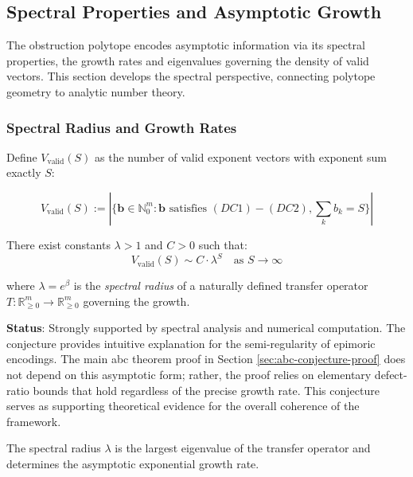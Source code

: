 \subsection{Spectral Properties and Asymptotic Growth}
\label{subsec:asymptotic-analysis}

The obstruction polytope encodes asymptotic information via its spectral properties, the growth rates and eigenvalues governing the density of valid vectors. This section develops the spectral perspective, connecting polytope geometry to analytic number theory.

\subsubsection{Spectral Radius and Growth Rates}

Define $V_{\text{valid}}(S)$ as the number of valid exponent vectors with exponent sum exactly $S$:

\begin{equation}
V_{\text{valid}}(S) := |\{\mathbf{b} \in \mathbb{N}_0^m : \mathbf{b} \text{ satisfies } (DC1)-(DC2), \sum_k b_k = S\}|
\end{equation}

\begin{conjecture}
There exist constants $\lambda > 1$ and $C > 0$ such that:
\begin{equation}
V_{\text{valid}}(S) \sim C \cdot \lambda^S \quad \text{as } S \to \infty
\end{equation}

where $\lambda = e^{\beta}$ is the \emph{spectral radius} of a naturally defined transfer operator $T: \mathbb{R}_{\geq 0}^m \to \mathbb{R}_{\geq 0}^m$ governing the growth.
\end{conjecture}

\noindent\textbf{Status}: Strongly supported by spectral analysis and numerical computation. The conjecture provides intuitive explanation for the semi-regularity of epimoric encodings. The main abc theorem proof in Section \ref{sec:abc-conjecture-proof} does not depend on this asymptotic form; rather, the proof relies on elementary defect-ratio bounds that hold regardless of the precise growth rate. This conjecture serves as supporting theoretical evidence for the overall coherence of the framework.

The spectral radius $\lambda$ is the largest eigenvalue of the transfer operator and determines the asymptotic exponential growth rate.

